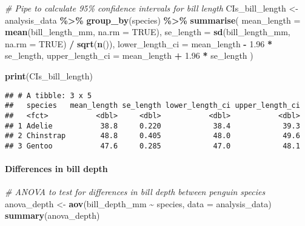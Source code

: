 \documentclass[
]{article}
\newenvironment{Shaded}{\begin{snugshade}}{\end{snugshade}}
\newcommand{\AttributeTok}[1]{\textcolor[rgb]{0.13,0.29,0.53}{#1}}
\newcommand{\CommentTok}[1]{\textcolor[rgb]{0.56,0.35,0.01}{\textit{#1}}}
\newcommand{\ConstantTok}[1]{\textcolor[rgb]{0.56,0.35,0.01}{#1}}
\newcommand{\FloatTok}[1]{\textcolor[rgb]{0.00,0.00,0.81}{#1}}
\newcommand{\FunctionTok}[1]{\textcolor[rgb]{0.13,0.29,0.53}{\textbf{#1}}}
\newcommand{\NormalTok}[1]{#1}
\newcommand{\OtherTok}[1]{\textcolor[rgb]{0.56,0.35,0.01}{#1}}
\newcommand{\SpecialCharTok}[1]{\textcolor[rgb]{0.81,0.36,0.00}{\textbf{#1}}}
\begin{document}
\begin{Shaded}
\begin{Highlighting}[]
\CommentTok{\# Pipe to calculate 95\% confidence intervals for bill length}
\NormalTok{CIs\_bill\_length }\OtherTok{\textless{}{-}}\NormalTok{ analysis\_data }\SpecialCharTok{\%\textgreater{}\%}
  \FunctionTok{group\_by}\NormalTok{(species) }\SpecialCharTok{\%\textgreater{}\%}
  \FunctionTok{summarise}\NormalTok{(}
    \AttributeTok{mean\_length =} \FunctionTok{mean}\NormalTok{(bill\_length\_mm, }\AttributeTok{na.rm =} \ConstantTok{TRUE}\NormalTok{),}
    \AttributeTok{se\_length =} \FunctionTok{sd}\NormalTok{(bill\_length\_mm, }\AttributeTok{na.rm =} \ConstantTok{TRUE}\NormalTok{) }\SpecialCharTok{/} \FunctionTok{sqrt}\NormalTok{(}\FunctionTok{n}\NormalTok{()),}
    \AttributeTok{lower\_length\_ci =}\NormalTok{ mean\_length }\SpecialCharTok{{-}} \FloatTok{1.96} \SpecialCharTok{*}\NormalTok{ se\_length,}
    \AttributeTok{upper\_length\_ci =}\NormalTok{ mean\_length }\SpecialCharTok{+} \FloatTok{1.96} \SpecialCharTok{*}\NormalTok{ se\_length}
\NormalTok{  )}

\FunctionTok{print}\NormalTok{(CIs\_bill\_length)}
\end{Highlighting}
\end{Shaded}

\begin{verbatim}
## # A tibble: 3 x 5
##   species   mean_length se_length lower_length_ci upper_length_ci
##   <fct>           <dbl>     <dbl>           <dbl>           <dbl>
## 1 Adelie           38.8     0.220            38.4            39.3
## 2 Chinstrap        48.8     0.405            48.0            49.6
## 3 Gentoo           47.6     0.285            47.0            48.1
\end{verbatim}

\paragraph{Differences in bill depth}\label{differences-in-bill-depth}

\begin{Shaded}
\begin{Highlighting}[]
\CommentTok{\# ANOVA to test for differences in bill depth between penguin species}
\NormalTok{anova\_depth }\OtherTok{\textless{}{-}} \FunctionTok{aov}\NormalTok{(bill\_depth\_mm }\SpecialCharTok{\textasciitilde{}}\NormalTok{ species, }\AttributeTok{data =}\NormalTok{ analysis\_data)}
\FunctionTok{summary}\NormalTok{(anova\_depth)}
\end{Highlighting}
\end{Shaded}
\end{document}
